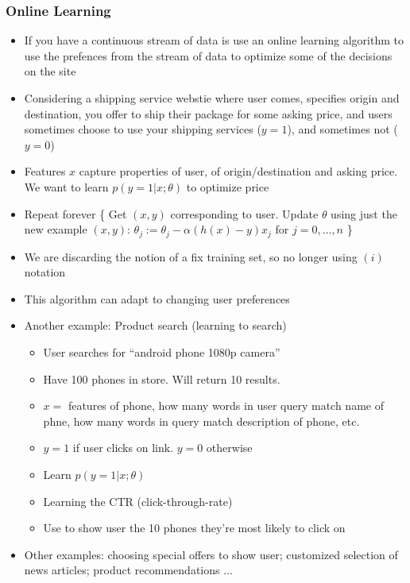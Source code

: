 \subsubsection{Online Learning}
\begin{itemize}[--]
	\item If you have a continuous stream of data is use an online learning algorithm to use the prefences from the stream of data to optimize some of the decisions on the site
	\item Considering a shipping service webstie where user comes, specifies origin and destination, you offer to ship their package for some asking price, and users sometimes choose to use your shipping services ($y=1$), and sometimes not ($y=0$)
	\item Features $x$ capture properties of user, of origin/destination and asking price. We want to learn $p(y=1|x;\theta)$ to optimize price
	\item Repeat forever \{
	Get $(x,y)$ corresponding to user.
	Update $\theta$ using just the new example $(x,y)$:
		$\theta_j := \theta_j - \alpha (h(x) - y)x_j$ for $j=0,\ldots, n$
	\}
	\item We are discarding the notion of a fix training set, so no longer using ${(i)}$ notation
	\item This algorithm can adapt to changing user preferences
	\item Another example: Product search (learning to search)
	\begin{itemize}[--]
		\item User searches for ``android phone 1080p camera''
		\item Have 100 phones in store. Will return 10 results.
		\item $x=$ features of phone, how many words in user query match name of phne, how many words in query match description of phone, etc.
		\item $y=1$ if user clicks on link. $y=0$ otherwise
		\item Learn $p(y=1|x;\theta)$
		\item Learning the CTR (click-through-rate)
		\item Use to show user the 10 phones they're most likely to click on
	\end{itemize}
	\item Other examples: choosing special offers to show user; customized selection of news articles; product recommendations $\ldots$
\end{itemize}

